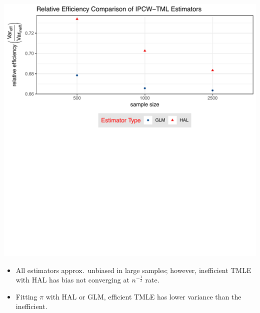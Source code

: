 \documentclass[landscape,a0paper,fontscale=0.285]{baposter} %
\begin{document}
\begin{poster}
{\begin{multicols}{2}
\begin{center}
\includegraphics[scale=0.39]{rel_eff_composed_plot}
\end{center}

\vspace{-15pt}

\begin{itemize}
  \itemsep0pt
  \item All estimators approx.~unbiased in large samples; however, inefficient
    TMLE with HAL has bias not converging at $n^{-\frac{1}{2}}$ rate.
  \item Fitting $\pi$ with HAL or GLM, efficient TMLE has lower variance than
    the inefficient.\\
\end{itemize}

\end{multicols}
}


\end{poster}
\end{document}
